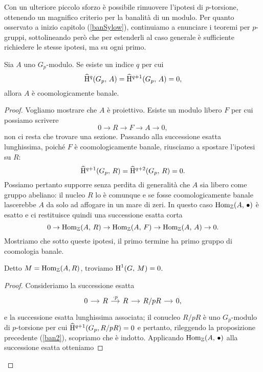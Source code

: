 Con un ulteriore piccolo sforzo è possibile rimuovere l'ipotesi di $ p $-torsione, ottenendo un magnifico criterio per la banalità di un modulo. Per quanto osservato a inizio capitolo (\ref{banSylow}), continuiamo a enunciare i teoremi per $ p $-gruppi, sottolineando però che per estenderli al caso generale è sufficiente richiedere le stesse ipotesi, ma su ogni primo.

\begin{theorem} \label{CriterioBanalita}
	Sia $ A $ uno $ G_p $-modulo. Se esiste un indice $ q $ per cui
	\[ \operatorname{\widehat{H}^\mathnormal{q}}(G_p, \, A) = \operatorname{\widehat{H}^{\mathnormal{q}+1}}(G_p, \, A) = 0, \]
	allora $ A $ è coomologicamente banale.
\end{theorem}

\begin{proof}
	Vogliamo mostrare che $ A $ è proiettivo. Esiste un modulo libero $ F $ per cui possiamo scrivere
	\begin{equation*}
		0 \to R \to F \to A \to 0,
	\end{equation*}
	non ci resta che trovare una sezione.
	Passando alla successione esatta lunghissima, poiché $ F $ è coomologicamente banale, riusciamo a spostare l'ipotesi su $ R $:
	\[ \operatorname{\widehat{H}^{\mathnormal{q}+1}}(G_p, \, R) = \operatorname{\widehat{H}^{\mathnormal{q}+2}}(G_p, \, R) = 0. \]
	Possiamo pertanto supporre senza perdita di generalità che $ A $ sia libero come gruppo abeliano: il nucleo $ R $ lo è comunque e se fosse coomologicamente banale lascerebbe $ A $ da solo ad affogare in un mare di zeri. In questo caso $ \operatorname{Hom}_{\mathbb{Z}}(A, \, \bullet) $ è esatto e ci restituisce quindi una successione esatta corta
	\begin{equation}\label{homban3}
		0 \to \operatorname{Hom}_{\mathbb{Z}}(A, \, R) \to \operatorname{Hom}_{\mathbb{Z}}(A, \, F) \to \operatorname{Hom}_{\mathbb{Z}}(A, \, A) \to 0.
	\end{equation}
	Mostriamo che sotto queste ipotesi, il primo termine ha primo gruppo di coomologia banale.
	\begin{lemma}
		Detto $ M = \operatorname{Hom}_{\mathbb{Z}}(A, R) $, troviamo $ \operatorname{H}^1(G, \, M) = 0 $.
	\end{lemma}
	\begin{proof}
		Consideriamo la successione esatta
		\begin{equation*}
		\begin{tikzcd}[column sep = small]
		0 \rar & R \rar["\cdot p"] & R \rar & R/pR \rar & 0,
		\end{tikzcd}
		\end{equation*}
		e la successione esatta lunghissima associata; il conucleo $ R/pR $ è uno $ G_p $-modulo di $ p $-torsione per cui $ \operatorname{\widehat{H}^{\mathnormal{q}+1}}(G_p, R/pR) = 0 $ e pertanto, rileggendo la proposizione precedente (\ref{ban2}), scopriamo che è indotto. Applicando $ \operatorname{Hom}_{\mathbb{Z}}(A, \, \bullet) $ alla successione esatta otteniamo

\end{proof}
\end{proof}

